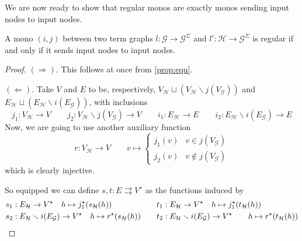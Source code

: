 \documentclass[runningheads,envcountsect]{lmcs}
\theoremstyle{plain}
\theoremstyle{definition}
\begin{document}
We are now ready to show that regular monos are exactly monos sending input nodes to input nodes.

\begin{lem}\label{lem:reg} A mono $(i,j)$ between two term graphs  $l:\mathcal{G}\to \mathcal{G}^{\Sigma}$ and  $l':\mathcal{H}\to \mathcal{G}^{\Sigma}$ is regular if and only if it sends input nodes to input nodes.
\end{lem}

\begin{proof}
	$(\Rightarrow)$. This follows at once from \cref{prop:equ}.
		
	\noindent	
	$(\Leftarrow)$. Take $V$ and $E$ to be, respectively, $V_{\mathcal{H}}\sqcup( V_{\mathcal{H}}\smallsetminus j(V_{\mathcal{G}}))$ and $E_{\mathcal{H}}\sqcup ( E_{\mathcal{H}}\smallsetminus i(E_{\mathcal{G}}))$, with inclusions
		\[ j_1:V_{\mathcal{H}}\to V\qquad j_2:V_{\mathcal{H}}\smallsetminus j(V_{\mathcal{G}})\to V \qquad  i_1:E_{\mathcal{H}}\to E \qquad i_2:E_{\mathcal{H}}\smallsetminus i(E_{\mathcal{G}})\to E \]
		Now, we are going to use another auxiliary function 
		\[r:V_{\mathcal{H}}\to V \qquad v\mapsto \begin{cases}
		j_1(v) & v \in j(V_{\mathcal{G}})\\
		j_2(v) & v\notin j(V_{\mathcal{G}})
		\end{cases}\]
		which is clearly injective.
		
		So equipped we can define $s,t:E\rightrightarrows V^\star$ as the functions induced by
		\begin{equation*}
		\begin{split}
	s_1&: E_{\mathcal{H}}\to V^\star  \quad h\mapsto j^\star_1\qty(s_{\mathcal{H}}\qty(h))\\
		s_2&:E_{\mathcal{H}}\smallsetminus i(E_{\mathcal{G}})\to V^\star \quad h\mapsto r^\star(s_{\mathcal{H}}(h))
		\end{split} \qquad 
		\begin{split}t_1&: E_{\mathcal{H}}\to V^\star  \quad h\mapsto j^\star_1\qty(t_{\mathcal{H}}\qty(h))
		\\ 
		t_2&:E_{\mathcal{H}}\smallsetminus i(E_{\mathcal{G}})\to V^\star \qquad h\mapsto r^\star(t_{\mathcal{H}}(h))
		\end{split}
		\end{equation*}
	

\end{proof}
\end{document}
